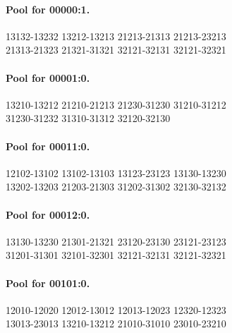 \documentclass[11pt]{article}
\theoremstyle{remark}
\numberwithin{equation}{section}
\numberwithin{table}{section}
\begin{document}
\paragraph{Pool for 00000:1.}
\begingroup\footnotesize\ttfamily\begin{flushleft}
13132-13232 13212-13213 21213-21313 21213-23213\\
21313-21323 21321-31321 32121-32131 32121-32321\\
\end{flushleft}\endgroup
\paragraph{Pool for 00001:0.}
\begingroup\footnotesize\ttfamily\begin{flushleft}
13210-13212 21210-21213 21230-31230 31210-31212\\
31230-31232 31310-31312 32120-32130\\
\end{flushleft}\endgroup
\paragraph{Pool for 00011:0.}
\begingroup\footnotesize\ttfamily\begin{flushleft}
12102-13102 13102-13103 13123-23123 13130-13230\\
13202-13203 21203-21303 31202-31302 32130-32132\\
\end{flushleft}\endgroup
\paragraph{Pool for 00012:0.}
\begingroup\footnotesize\ttfamily\begin{flushleft}
13130-13230 21301-21321 23120-23130 23121-23123\\
31201-31301 32101-32301 32121-32131 32121-32321\\
\end{flushleft}\endgroup
\paragraph{Pool for 00101:0.}
\begingroup\footnotesize\ttfamily\begin{flushleft}
12010-12020 12012-13012 12013-12023 12320-12323\\
13013-23013 13210-13212 21010-31010 23010-23210\\
\end{flushleft}\endgroup
\end{document}
